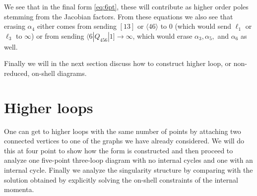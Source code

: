 \documentclass[letter,11pt]{article}
\newcommand{\ab}[1]{\langle #1 \rangle}
\newcommand{\sqb}[1]{[ #1 ]}
\newcommand{\aMs}[3]{\langle #1|#2|#3]}  		%
\begin{document}
We see that in the final form \eqref{eq:6pt}, these will contribute as higher order poles stemming from the Jacobian factors.  From these equations we also see that erasing $\alpha_4$ either comes from sending $\sqb{13}$ or $\ab{46}$ to 0 (which would send $\ell_1$ or $\ell_3$ to $\infty$) or from sending $\aMs{6}{Q_{456}}{1}\to \infty$, which would erase $\alpha_3,\alpha_5,$ and $\alpha_6$ as well.

Finally we will in the next section discuss how to construct higher loop, or non-reduced, on-shell diagrams. 
\newpage
\section{Higher loops\label{sec:higherloops}}
One can get to higher loops with the same number of points by attaching two connected vertices to one of the graphs we have already considered. We will do this at four point to show how the form is constructed and then proceed to analyze one five-point three-loop diagram with no internal cycles and one with an internal cycle. Finally we analyze the singularity structure by comparing with the solution obtained by explicitly solving the on-shell constraints of the internal momenta.
\end{document}
